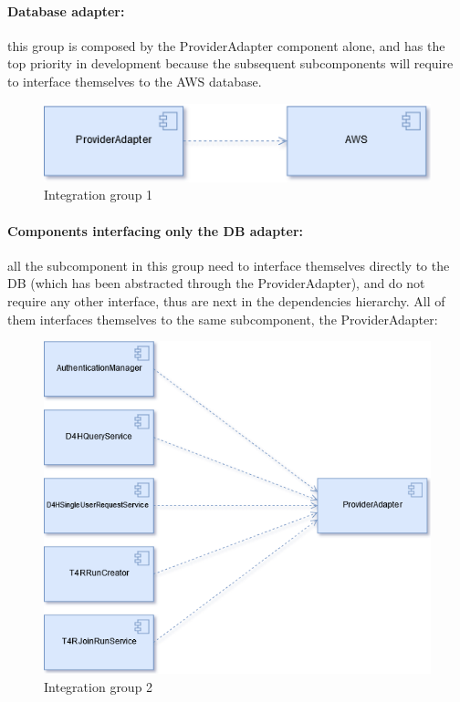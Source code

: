 \paragraph{Database adapter:} this group is composed by the ProviderAdapter component alone, and has the top priority in development because the subsequent subcomponents will require to interface themselves to the AWS database.
\begin{figure}[H]
    \includegraphics[width=.7\linewidth, keepaspectratio]{./Images/Section5/integration_g1.png}
    \centering
    \caption{Integration group 1}
    \label{fig:intg1}
 \end{figure}

\paragraph{Components interfacing only the DB adapter:} all the subcomponent in this group need to interface themselves directly to the DB (which has been abstracted through the ProviderAdapter), and do not require any other interface, thus are next in the dependencies hierarchy. All of them interfaces themselves to the same subcomponent, the ProviderAdapter:
\begin{figure}[H]
    \includegraphics[width=.7\linewidth, keepaspectratio]{./Images/Section5/integration_g2.png}
    \centering
    \caption{Integration group 2}
    \label{fig:intg2}
 \end{figure}

\newpage
